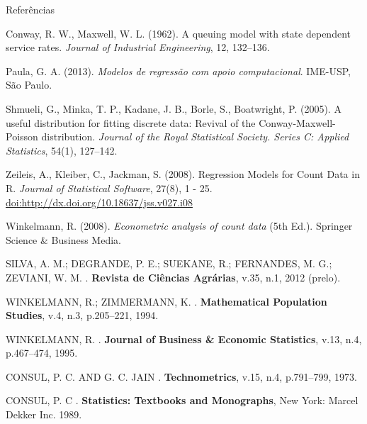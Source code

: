 \documentclass[10pt, aspectratio=169]{beamer}\usepackage[]{graphicx}\usepackage[]{color}
\begin{document}
\begin{frame}[allowframebreaks]{Referências}
\small

\begin{thebibliography}{99}
 Conway, R. W., Maxwell, W. L. (1962).
A queuing model with state dependent service rates. {\em Journal of
Industrial Engineering}, 12, 132–136.

 Paula, G. A. (2013). {\em Modelos de regress\~ao com
apoio computacional}. IME-USP, S\~ao Paulo.

 Shmueli, G., Minka, T. P., Kadane, J. B., Borle,
S., Boatwright, P. (2005). A useful distribution for fitting discrete
data: Revival of the Conway-Maxwell-Poisson distribution. {\em Journal of
the Royal Statistical Society. Series C: Applied Statistics}, 54(1),
127–142.

 Zeileis, A., Kleiber, C., Jackman, S. (2008). 
Regression Models for Count Data in R. {\em Journal of Statistical
Software}, 27(8), 1 - 25. 
\url{doi:http://dx.doi.org/10.18637/jss.v027.i08}

 Winkelmann, R. (2008). {\em Econometric analysis
of count data} (5th Ed.). Springer Science \& Business Media.

\MakeUppercase{Silva, A. M.; Degrande, P. E.; Suekane, R.; Fernandes,
  M. G.; Zeviani, W. M.}
.
\newblock \textbf{Revista de Ciências Agrárias}, v.35, n.1, 2012 (prelo).

\MakeUppercase{Winkelmann, R.; Zimmermann, K.}
.
\newblock \textbf{Mathematical Population Studies}, v.4, n.3, p.205--221, 1994.

\MakeUppercase{Winkelmann, R.}
.
\newblock \textbf{Journal of Business \& Economic Statistics}, v.13, n.4,
  p.467--474, 1995.

\MakeUppercase{Consul, P. C. and G. C. Jain}
.
\textbf{Technometrics}, v.15, n.4, p.791--799, 1973.

\MakeUppercase{Consul, P. C}
. \textbf{Statistics: Textbooks and Monographs}, New
York: Marcel Dekker Inc. 1989.

\end{thebibliography}
\end{frame}
\end{document}
